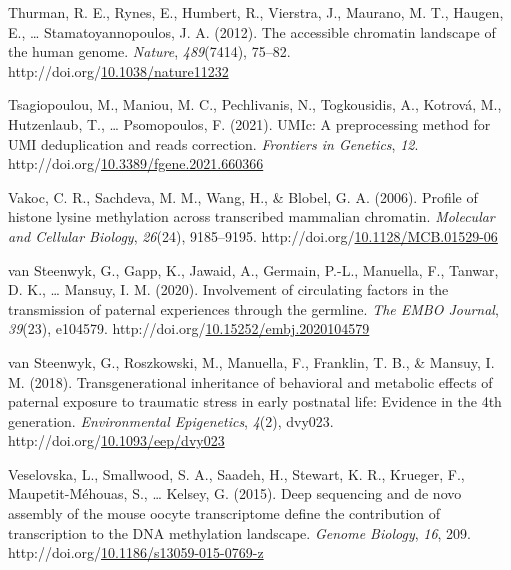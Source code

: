 \documentclass[12pt,twoside]{reedthesis}
\newlength{\cslhangindent}
\newenvironment{CSLReferences}[2] %
 {%
  \setlength{\parindent}{0pt}
  \ifodd #1 \everypar{\setlength{\hangindent}{\cslhangindent}}\ignorespaces\fi
  \ifnum #2 > 0
  \setlength{\parskip}{#2\baselineskip}
  \fi
 }%
 {}
\begin{document}
\begin{CSLReferences}{1}{0}
\leavevmode{}%
Thurman, R. E., Rynes, E., Humbert, R., Vierstra, J., Maurano, M. T., Haugen, E., \ldots{} Stamatoyannopoulos, J. A. (2012). The accessible chromatin landscape of the human genome. \emph{Nature}, \emph{489}(7414), 75--82. http://doi.org/\href{https://doi.org/10.1038/nature11232}{10.1038/nature11232}

\leavevmode{}%
Tsagiopoulou, M., Maniou, M. C., Pechlivanis, N., Togkousidis, A., Kotrová, M., Hutzenlaub, T., \ldots{} Psomopoulos, F. (2021). UMIc: A preprocessing method for UMI deduplication and reads correction. \emph{Frontiers in Genetics}, \emph{12}. http://doi.org/\href{https://doi.org/10.3389/fgene.2021.660366}{10.3389/fgene.2021.660366}

\leavevmode{}%
Vakoc, C. R., Sachdeva, M. M., Wang, H., \& Blobel, G. A. (2006). Profile of histone lysine methylation across transcribed mammalian chromatin. \emph{Molecular and Cellular Biology}, \emph{26}(24), 9185--9195. http://doi.org/\href{https://doi.org/10.1128/MCB.01529-06}{10.1128/MCB.01529-06}

\leavevmode{}%
van Steenwyk, G., Gapp, K., Jawaid, A., Germain, P.-L., Manuella, F., Tanwar, D. K., \ldots{} Mansuy, I. M. (2020). Involvement of circulating factors in the transmission of paternal experiences through the germline. \emph{The EMBO Journal}, \emph{39}(23), e104579. http://doi.org/\href{https://doi.org/10.15252/embj.2020104579}{10.15252/embj.2020104579}

\leavevmode{}%
van Steenwyk, G., Roszkowski, M., Manuella, F., Franklin, T. B., \& Mansuy, I. M. (2018). Transgenerational inheritance of behavioral and metabolic effects of paternal exposure to traumatic stress in early postnatal life: Evidence in the 4th generation. \emph{Environmental Epigenetics}, \emph{4}(2), dvy023. http://doi.org/\href{https://doi.org/10.1093/eep/dvy023}{10.1093/eep/dvy023}

\leavevmode{}%
Veselovska, L., Smallwood, S. A., Saadeh, H., Stewart, K. R., Krueger, F., Maupetit-Méhouas, S., \ldots{} Kelsey, G. (2015). Deep sequencing and de novo assembly of the mouse oocyte transcriptome define the contribution of transcription to the DNA methylation landscape. \emph{Genome Biology}, \emph{16}, 209. http://doi.org/\href{https://doi.org/10.1186/s13059-015-0769-z}{10.1186/s13059-015-0769-z}


\end{CSLReferences}
\end{document}
